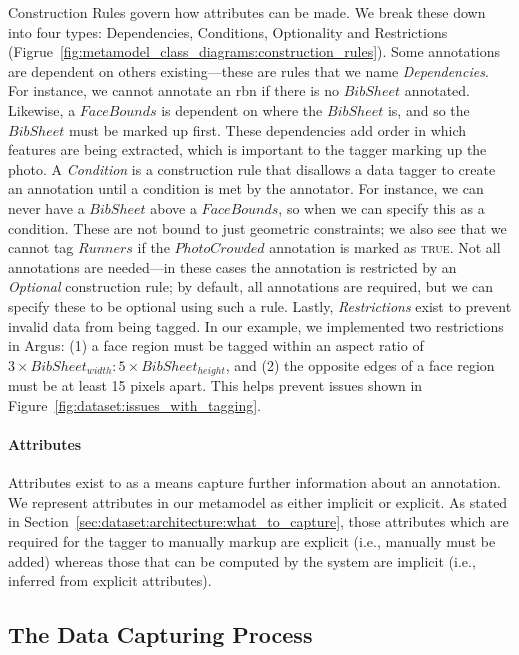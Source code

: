 Construction Rules govern how attributes can be made. We break these down into four types: Dependencies, Conditions, Optionality and Restrictions (Figrue~\ref{fig:metamodel_class_diagrams:construction_rules}). Some annotations are dependent on others existing---these are rules that we name \textit{Dependencies}. For instance, we cannot annotate an \gls{rbn} if there is no $BibSheet$ annotated. Likewise, a $FaceBounds$ is dependent on where the $BibSheet$ is, and so the $BibSheet$ must be marked up first. These dependencies add order in which features are being extracted, which is important to the tagger marking up the photo. A \textit{Condition} is a construction rule that disallows a data tagger to create an annotation until a condition is met by the annotator. For instance, we can never have a $BibSheet$ above a $FaceBounds$, so when we can specify this as a condition. These are not bound to just geometric constraints; we also see that we cannot tag $Runners$ if the $PhotoCrowded$ annotation is marked as \textsc{true}. Not all annotations are needed---in these cases the annotation is restricted by an \textit{Optional} construction rule; by default, all annotations are required, but we can specify these to be optional using such a rule. Lastly, \textit{Restrictions} exist to prevent invalid data from being tagged. In our example, we implemented two restrictions in Argus: (1) a face region must be tagged within an aspect ratio of $3 \times BibSheet_{width} : 5 \times BibSheet_{height}$, and (2) the opposite edges of a face region must be at least 15 pixels apart. This helps prevent issues shown in Figure~\ref{fig:dataset:issues_with_tagging}.


\paragraph{Attributes}

Attributes exist to as a means capture further information about an annotation. We represent attributes in our metamodel as either implicit or explicit. As stated in Section~\ref{sec:dataset:architecture:what_to_capture}, those attributes which are required for the tagger to manually markup are explicit (i.e., manually must be added) whereas those that can be computed by the system are implicit (i.e., inferred from explicit attributes).

\subsection{The Data Capturing Process}

